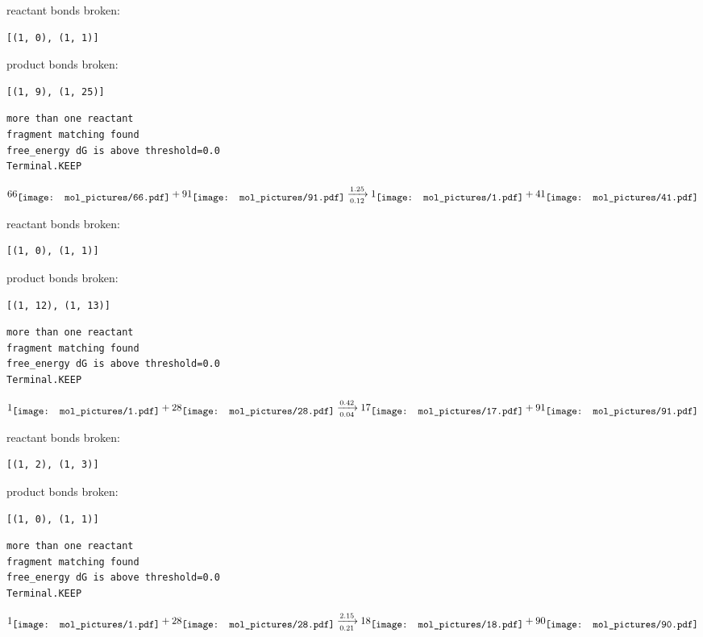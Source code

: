 \documentclass{article}
\begin{document}
reactant bonds broken:\begin{verbatim}
[(1, 0), (1, 1)]
\end{verbatim}
product bonds broken:\begin{verbatim}
[(1, 9), (1, 25)]
\end{verbatim}




\vspace{1cm}
\begin{verbatim}
more than one reactant
fragment matching found
free_energy dG is above threshold=0.0
Terminal.KEEP
\end{verbatim}
$$
66
\raisebox{-.5\height}{\texttt{[image: mol\_pictures/66.pdf]}}
+
91
\raisebox{-.5\height}{\texttt{[image: mol\_pictures/91.pdf]}}
\xrightarrow[0.12]{1.25}
1
\raisebox{-.5\height}{\texttt{[image: mol\_pictures/1.pdf]}}
+
41
\raisebox{-.5\height}{\texttt{[image: mol\_pictures/41.pdf]}}
$$


reactant bonds broken:\begin{verbatim}
[(1, 0), (1, 1)]
\end{verbatim}
product bonds broken:\begin{verbatim}
[(1, 12), (1, 13)]
\end{verbatim}




\vspace{1cm}
\begin{verbatim}
more than one reactant
fragment matching found
free_energy dG is above threshold=0.0
Terminal.KEEP
\end{verbatim}
$$
1
\raisebox{-.5\height}{\texttt{[image: mol\_pictures/1.pdf]}}
+
28
\raisebox{-.5\height}{\texttt{[image: mol\_pictures/28.pdf]}}
\xrightarrow[0.04]{0.42}
17
\raisebox{-.5\height}{\texttt{[image: mol\_pictures/17.pdf]}}
+
91
\raisebox{-.5\height}{\texttt{[image: mol\_pictures/91.pdf]}}
$$


reactant bonds broken:\begin{verbatim}
[(1, 2), (1, 3)]
\end{verbatim}
product bonds broken:\begin{verbatim}
[(1, 0), (1, 1)]
\end{verbatim}




\vspace{1cm}
\begin{verbatim}
more than one reactant
fragment matching found
free_energy dG is above threshold=0.0
Terminal.KEEP
\end{verbatim}
$$
1
\raisebox{-.5\height}{\texttt{[image: mol\_pictures/1.pdf]}}
+
28
\raisebox{-.5\height}{\texttt{[image: mol\_pictures/28.pdf]}}
\xrightarrow[0.21]{2.15}
18
\raisebox{-.5\height}{\texttt{[image: mol\_pictures/18.pdf]}}
+
90
\raisebox{-.5\height}{\texttt{[image: mol\_pictures/90.pdf]}}
$$
\end{document}
